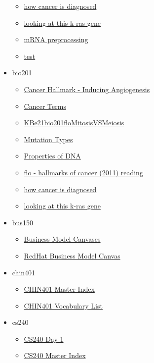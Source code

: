 \documentclass[11pt]{article}
\begin{document}
\begin{itemize}
\begin{itemize}
\item \href{bio101/KBrefCancerDiagnosisSteps.org}{how cancer is diagnosed}
\item \href{bio101/KBe21bio201floKRASgeneMutationCellCycleAndCancer.org}{looking at this k-ras gene}
\item \href{bio101/KBhBIO101mRNAPreprocessing.org}{mRNA preprocessing}
\item \href{bio101/test.org}{test}
\end{itemize}
\item bio201
\begin{itemize}
\item \href{bio201/cancer\_angiogenesis.org}{Cancer Hallmark - Inducing Angiogenesis}
\item \href{bio201/KBrefCancerVocab.org}{Cancer Terms}
\item \href{bio201/KBe21bio201floMitosisVSMeiosis.org}{KBe21bio201floMitosisVSMeiosis}
\item \href{bio201/KBrefMutationTypes.org}{Mutation Types}
\item \href{bio201/KBrefPropertiesOfDNA.org}{Properties of DNA}
\item \href{bio201/KBe21bio201floHallmarksOfCancer.org}{flo - hallmarks of cancer (2011) reading}
\item \href{bio201/KBrefCancerDiagnosisSteps.org}{how cancer is diagnosed}
\item \href{bio201/KBe21bio201floKRASgeneMutationCellCycleAndCancer.org}{looking at this k-ras gene}
\end{itemize}
\item bus150
\begin{itemize}
\item \href{bus150/KBrefBusinesssModelCanvas.org}{Business Model Canvases}
\item \href{bus150/KBe21bus150retBusinessModelCanvasRedHad.org}{RedHat Business Model Canvas}
\end{itemize}
\item chin401
\begin{itemize}
\item \href{chin401/KBCHIN401MasterIndex.org}{CHIN401 Master Index}
\item \href{chin401/KBdCHIN401Vocabulary.org}{CHIN401 Vocabulary List}
\end{itemize}
\item cs240
\begin{itemize}
\item \href{cs240/KBhCS240Day1.org}{CS240 Day 1}
\item \href{cs240/KBCS240MasterIndex.org}{CS240 Master Index}

\end{itemize}
\end{itemize}
\end{document}
